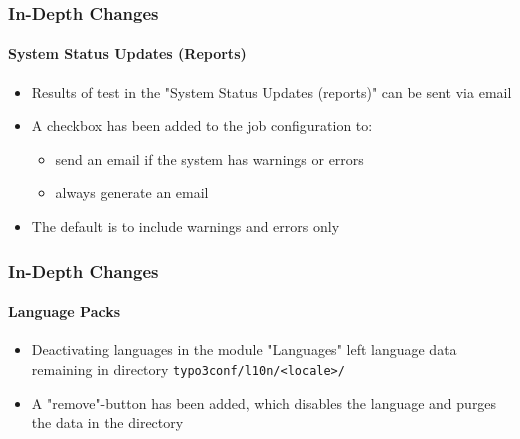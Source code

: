 \begin{frame}[fragile]
	\frametitle{In-Depth Changes}
	\framesubtitle{System Status Updates (Reports)}

	\begin{itemize}
		\item Results of test in the "System Status Updates (reports)" can be sent via email
		\item A checkbox has been added to the job configuration to:

			\begin{itemize}
				\item send an email if the system has warnings or errors
				\item always generate an email
			\end{itemize}

		\item The default is to include warnings and errors only

	\end{itemize}

\end{frame}







\begin{frame}[fragile]
	\frametitle{In-Depth Changes}
	\framesubtitle{Language Packs}

	\begin{itemize}
		\item Deactivating languages in the module "Languages" left language data remaining
			in directory \texttt{typo3conf/l10n/<locale>/}
		\item A "remove"-button has been added, which disables the language and purges the
			data in the directory
	\end{itemize}

\end{frame}








